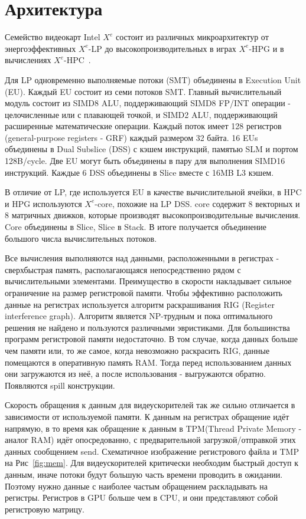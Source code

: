 \section{Архитектура}
\label{sec:Arch}

Семейство видеокарт Intel $X^e$ состоит из различных микроархитектур от энергоэффективных $X^e$-LP до высокопроизводительных в играх $X^e$-HPG и в вычислениях $X^e$-HPC~\cite{intelArch}.

Для LP одновременно выполняемые потоки (SMT) объединены в Execution Unit (EU). Каждый EU состоит из семи потоков SMT. Главный вычислительный модуль состоит из SIMD8 ALU, поддерживающий SIMD8 FP/INT операции - целочисленные или с плавающей точкой, и SIMD2 ALU, поддерживающий расширенные математические операции. Каждый поток имеет 128 регистров (general-purpose registers - GRF) каждый размером 32 байта. 16 EUs объединены в Dual Subslice (DSS) с кэшем инструкций, памятью SLM и портом 128B/cycle. Две EU могут быть объединены в пару для выполнения SIMD16 инструкций. Каждые 6 DSS объединены в Slice вместе с 16MB L3 кэшем.

В отличие от LP, где используется EU в качестве вычислительной ячейки, в HPC и HPG используются $X^e$-core, похожие на LP DSS. core содержит 8 векторных и 8 матричных движков, которые производят высокопроизводительные вычисления. Core объединены в Slice, Slice в Stack. В итоге получается объединение большого числа вычислительных потоков.

Все вычисления выполняются над данными, расположенными в регистрах - сверхбыстрая память, располагающаяся непосредственно рядом с вычислительными элементами. Преимущество в скорости накладывает сильное ограничение на размер регистровой памяти. Чтобы эффективно расположить данные на регистрах используется алгоритм раскрашивания RIG (Register interference graph). Алгоритм является NP-трудным и пока оптимального решения не найдено и пользуются различными эвристиками. Для большинства программ регистровой памяти недостаточно. В том случае, когда данных больше чем памяти или, то же самое, когда невозможно раскрасить RIG, данные помещаются в оперативную память RAM. Тогда перед использованием данных они загружаются из неё, а после использования - выгружаются обратно. Появляются spill конструкции.

Скорость обращения к данным для видеускорителей так же сильно отличается в зависимости от используемой памяти. К данным на регистрах обращение идёт напрямую, в то время как обращение к данным в TPM(Thread Private Memory - аналог RAM) идёт опосредованно, с предварительной загрузкой/отправкой этих данных сообщением send. Схематичное изображение регистрового файла и TMP на Рис~\ref{fig:mem}. Для видеускорителей критически необходим быстрый доступ к данным, иначе потоки будут большую часть времени проводить в ожидании. Поэтому нужно данные с наиболее частым обращением раскладывать на регистры. Регистров в GPU больше чем в CPU, и они представляют собой регистровую матрицу.

